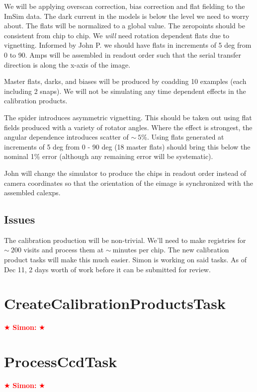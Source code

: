 \documentclass[12pt]{article}
\newcommand{\simon} { \textcolor{red} {
\ensuremath{\bigstar} {\bf Simon:}  
\ensuremath{\bigstar} } }
\begin{document}
We will be applying overscan correction, bias correction and flat
fielding to the ImSim data.  The dark current in the models is below
the level we need to worry about.  The flats will be normalized to a
global value.  The zeropoints should be consistent from chip to chip.
We {\it will} need rotation dependent flats due to vignetting.
Informed by John P. we should have flats in increments of 5 deg from 0
to 90.  Amps will be assembled in readout order such that the serial
transfer direction is along the x-axis of the image.

Master flats, darks, and biases will be produced by coadding 10
examples (each including 2 snaps).  We will not be simulating any time
dependent effects in the calibration products.

The spider introduces asymmetric vignetting.  This should be taken out
using flat fields produced with a variety of rotator angles.  Where
the effect is strongest, the angular dependence introduces scatter of
$\sim~5$\%.  Using flats generated at increments of 5 deg from 0 - 90
deg (18 master flats) should bring this below the nominal 1\% error
(although any remaining error will be systematic).

John will change the simulator to produce the chips in readout order
instead of camera coordinates so that the orientation of the eimage is
synchronized with the assembled calexps.

\subsection{Issues}

The calibration production will be non-trivial.  We'll need to make
registries for $\sim~200$ visits and process them at $\sim~$minutes
per chip.  The new calibration product tasks will make this much
easier.  Simon is working on said tasks.  As of Dec 11, 2 days worth
of work before it can be submitted for review.


\clearpage 
\section{CreateCalibrationProductsTask} \simon


\clearpage 
\section{ProcessCcdTask} \simon
\end{document}
